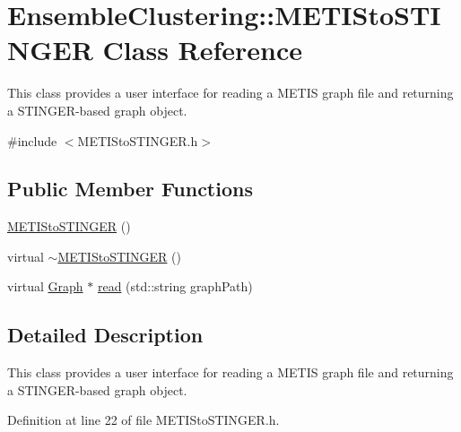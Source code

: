 \hypertarget{class_ensemble_clustering_1_1_m_e_t_i_sto_s_t_i_n_g_e_r}{\section{Ensemble\-Clustering\-:\-:M\-E\-T\-I\-Sto\-S\-T\-I\-N\-G\-E\-R Class Reference}
\label{class_ensemble_clustering_1_1_m_e_t_i_sto_s_t_i_n_g_e_r}
}


This class provides a user interface for reading a M\-E\-T\-I\-S graph file and returning a S\-T\-I\-N\-G\-E\-R-\/based graph object.  




{\ttfamily \#include $<$M\-E\-T\-I\-Sto\-S\-T\-I\-N\-G\-E\-R.\-h$>$}

\subsection*{Public Member Functions}
\begin{DoxyCompactItemize}
\item 
\hyperlink{class_ensemble_clustering_1_1_m_e_t_i_sto_s_t_i_n_g_e_r_af4f8ac58e71d795429ed9f2eeded23f9}{M\-E\-T\-I\-Sto\-S\-T\-I\-N\-G\-E\-R} ()
\item 
virtual \hyperlink{class_ensemble_clustering_1_1_m_e_t_i_sto_s_t_i_n_g_e_r_adf2bb3b7b7bfb865532a2fbcdf988639}{$\sim$\-M\-E\-T\-I\-Sto\-S\-T\-I\-N\-G\-E\-R} ()
\item 
virtual \hyperlink{class_ensemble_clustering_1_1_graph}{Graph} $\ast$ \hyperlink{class_ensemble_clustering_1_1_m_e_t_i_sto_s_t_i_n_g_e_r_aa2ebf2abdbf30c8878df0302f3b193ec}{read} (std\-::string graph\-Path)
\end{DoxyCompactItemize}


\subsection{Detailed Description}
This class provides a user interface for reading a M\-E\-T\-I\-S graph file and returning a S\-T\-I\-N\-G\-E\-R-\/based graph object. 

Definition at line 22 of file M\-E\-T\-I\-Sto\-S\-T\-I\-N\-G\-E\-R.\-h.




